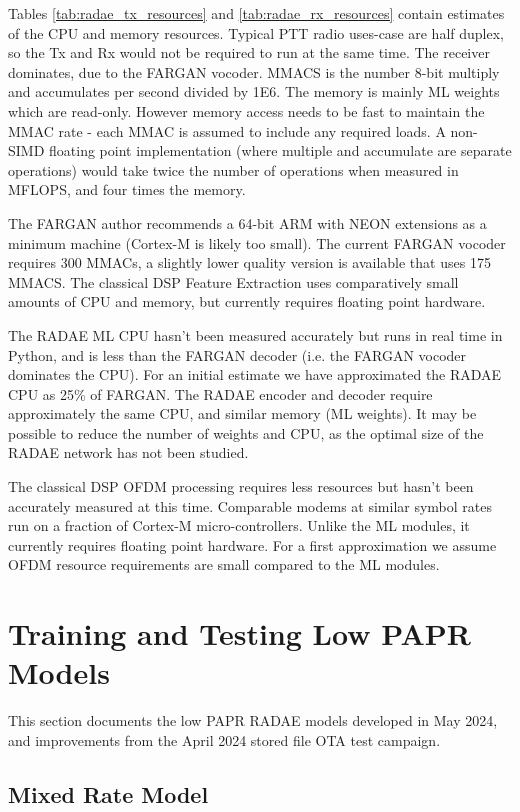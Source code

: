 \documentclass{article}
\begin{document}
Tables \ref{tab:radae_tx_resources} and \ref{tab:radae_rx_resources} contain estimates of the CPU and memory resources. Typical PTT radio uses-case are half duplex, so the Tx and Rx would not be required to run at the same time.  The receiver dominates, due to the FARGAN vocoder. MMACS is the number 8-bit multiply and accumulates per second divided by 1E6. The memory is mainly ML weights which are read-only.  However memory access needs to be fast to maintain the MMAC rate - each MMAC is assumed to include any required loads. A non-SIMD floating point implementation (where multiple and accumulate are separate operations) would take twice the number of operations when measured in MFLOPS, and four times the memory.
 
The FARGAN author recommends a 64-bit ARM with NEON extensions as a minimum machine (Cortex-M is likely too small). The current FARGAN vocoder requires 300 MMACs, a slightly lower quality version is available that uses 175 MMACS.  The classical DSP Feature Extraction uses comparatively small amounts of CPU and memory, but currently requires floating point hardware.

The RADAE ML CPU hasn't been measured accurately but runs in real time in Python, and is less than the FARGAN decoder (i.e. the FARGAN vocoder dominates the CPU).  For an initial estimate we have approximated the RADAE CPU as 25\% of FARGAN. The RADAE encoder and decoder require approximately the same CPU, and similar memory (ML weights).  It may be possible to reduce the number of weights and CPU, as the optimal size of the RADAE network has not been studied.

The classical DSP OFDM processing requires less resources but hasn't been accurately measured at this time.  Comparable modems at similar symbol rates run on a fraction of Cortex-M micro-controllers. Unlike the ML modules, it currently requires floating point hardware.  For a first approximation we assume OFDM resource requirements are small compared to the ML modules.

\section{Training and Testing Low PAPR Models}

This section documents the low PAPR RADAE models developed in May 2024, and improvements from the April 2024 stored file OTA test campaign.

\subsection{Mixed Rate Model}
\end{document}
